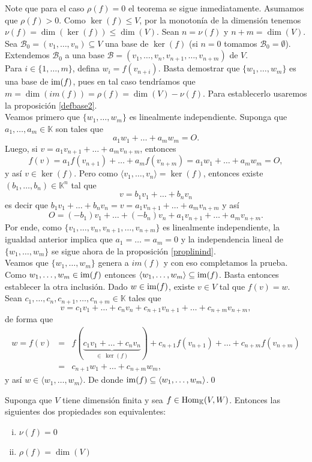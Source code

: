 \dem Note que para el caso $\rho(f)=0$ el teorema se sigue inmediatamente. Asumamos que $\rho(f)>0$. Como $\ker(f)\le V$, por la monoton\'ia de la dimensi\'on tenemos $\nu(f)=\dim\left(\ker(f)\right)\le\dim(V)$. Sean $n=\nu(f)$ y $n+m=\dim (V)$. Sea $\mathcal{B}_0=(v_1,\ldots,v_n)\subseteq V$ una base de $\ker(f)$ (si $n=0$ tomamos $\mathcal{B}_0=\emptyset$). Extendemos $\mathcal{B}_0$ a una base $\mathcal{B}=(v_1,\ldots,v_n,v_{n+1},\ldots,v_{n+m})$ de $V$.\\
Para $i\in\{1,\ldots,m\}$, defina $w_i=f(v_{n+i})$. Basta demostrar que $\{w_1,\ldots,w_m\}$ es una base de $\operatorname{im}(f)$, pues en tal caso tendr\'iamos que $m=\dim\left(im(f)\right)=\rho(f)=\dim (V)-\nu(f)$. Para establecerlo usaremos la proposici\'on \ref{defbase2}.\\
Veamos primero que $\{w_1,\ldots,w_m\}$ es linealmente independiente. Suponga que $a_1,\ldots,a_m\in \mathbb{K}$ son tales que
\[
a_1w_1+\ldots+a_mw_m=O.
\]
Luego, si $v=a_1v_{n+1}+\ldots+a_mv_{n+m}$, entonces
\[
f(v)=a_1f(v_{n+1})+\ldots+a_mf(v_{n+m})=a_1w_1+\ldots+a_mw_m=O,
\]
y as\'i $v\in\ker(f)$. Pero como $\langle v_1,\ldots,v_n\rangle=\ker(f)$, entonces existe $(b_1,\ldots,b_n)\in \mathbb{K}^n$ tal que
\[
v=b_1v_1+\ldots+b_nv_n
\]
es decir que $b_1v_1+\ldots+b_nv_n=v=a_1v_{n+1}+\ldots+a_mv_{n+m}$ y as\'i
\[
O=(-b_1)v_1+\ldots+(-b_n)v_n+a_1v_{n+1}+\ldots+a_mv_{n+m}.
\]
Por ende, como $\{v_1,\ldots,v_n,v_{n+1},\ldots,v_{n+m}\}$ es linealmente independiente, la igualdad anterior implica que $a_1=\ldots=a_m=0$ y la independencia lineal de $\{w_1,\ldots,w_m\}$ se sigue ahora de la  proposici\'on \ref{proplinind}.\\
Veamos que  $\{w_1,\ldots,w_m\}$ genera a $im(f)$ y con eso completamos la prueba. Como $w_1,\ldots,w_m\in \operatorname{im}(f)$ entonces $\langle w_1,\ldots,w_m\rangle\subseteq\operatorname{im}(f)$. Basta entonces establecer la otra inclusi\'on. Dado $w\in\operatorname{im}(f)$, existe $v\in V$ tal que $f(v)=w$. Sean $c_1,\ldots,c_n,c_{n+1},\ldots,c_{n+m}\in \mathbb{K}$ tales que 
\[
v=c_1v_1+\ldots+c_nv_n+c_{n+1}v_{n+1}+\ldots+c_{n+m}v_{n+m},
\]
de forma que
\begin{eqnarray*}
w=f(v) & = & f(\underbrace{c_1v_1+\ldots+c_nv_n}_{\in\ \ker(f)})+c_{n+1}f(v_{n+1})+\ldots+c_{n+m}f(v_{n+m})\\
           & = & c_{n+1}w_1+\ldots+c_{n+m}w_m,
\end{eqnarray*}
y as\'i $w\in\langle w_1,\ldots,w_m\rangle$. De donde $\operatorname{im}(f)\subseteq\langle w_1,\ldots,w_m\rangle$.\qed

\begin{coro}\label{corteorango}
Suponga que $V$ tiene dimensi\'on finita y sea $f\in\operatorname{Hom}_{\mathbb{K}}(V,W)$. Entonces las siguientes dos propiedades son equivalentes:
\begin{enumerate}[(i)]
\item $\nu(f)=0$
\item $\rho(f)=\dim(V)$
\end{enumerate}
\end{coro}

